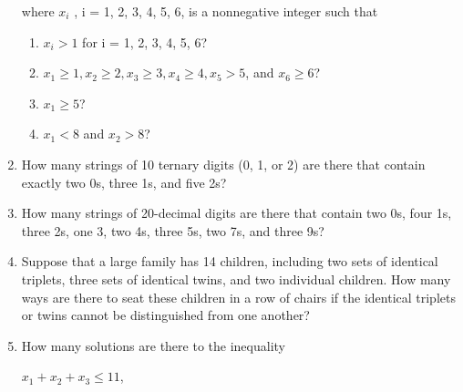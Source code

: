\documentclass[11pt,a4paper]{book}
\begin{document}
\begin{enumerate}
where $x_i$ , i = 1, 2, 3, 4, 5, 6, is a nonnegative integer such that
\begin{enumerate}[label=(\alph*)]
\item $x_i > 1$ for i = 1, 2, 3, 4, 5, 6?
\item $x_1 \geq 1, x_2 \geq 2, x_3 \geq 3, x_4 \geq 4, x_5 > 5$, and $x_6 \geq 6$?
\item $x_1 \geq 5$?
\item $x_1 < 8$ and $x_2 > 8$?
\end{enumerate}
\item How many strings of 10 ternary digits (0, 1, or 2) are there that contain exactly two 0s, three 1s, and five 2s?
\item How many strings of 20-decimal digits are there that contain two 0s, four 1s, three 2s, one 3, two 4s, three 5s, two 7s, and three 9s?
\item Suppose that a large family has 14 children, including two sets of identical triplets, three sets of identical twins, and two individual children.
How many ways are there to seat these children in a row of chairs if the identical triplets or twins cannot be distinguished from one another?
\item How many solutions are there to the inequality

$x_1 + x_2 + x_3 \leq 11$,


\end{enumerate}
\end{document}
